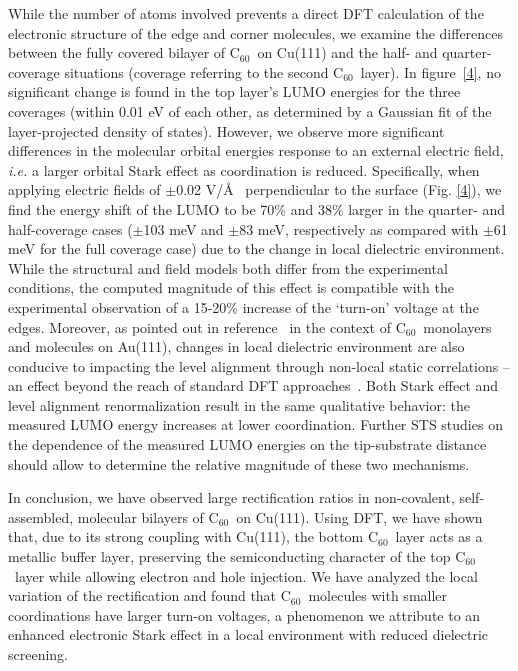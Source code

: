 \documentclass[11pt,showpacs,amsmath,amssymbl]{revtex4}
\newcommand{\buck}{C$_{60}$~}
\begin{document}
While the number of atoms involved prevents a direct DFT calculation of the electronic structure of the edge and corner molecules, we examine the differences between the fully covered bilayer of \buck on Cu(111) and the half- and quarter-coverage situations (coverage referring to the second \buck layer). In figure~\ref{4}, no significant change is found in the top layer's LUMO energies for the three coverages (within 0.01 eV of each other, as determined by a Gaussian fit of the layer-projected density of states). However, we observe more significant differences in the molecular orbital energies response to an external electric field, \textit{i.e.} a larger orbital Stark effect as coordination is reduced. Specifically, when applying electric fields of $\pm$0.02 V/\AA~ perpendicular to the surface (Fig. \ref{4}), we find the energy shift of the LUMO to be {70\% and 38\% larger in the quarter- and half-coverage cases ($\pm$103 meV and $\pm$83 meV, respectively} as compared with $\pm$61 meV for the full coverage case) due to the change in local dielectric environment. While the structural and field models both differ from the experimental {conditions}, the computed magnitude of this effect is compatible with the experimental observation of a 15-20\% increase of the `turn-on' voltage at the edges. {Moreover, as pointed out in reference~\cite{FernandezTorrente} in the context of \buck monolayers and molecules on Au(111), changes in local dielectric environment are also conducive to impacting the level alignment through non-local static correlations -- an effect beyond the reach of standard DFT approaches~\cite{Neaton}. Both Stark effect and level alignment renormalization result in the same qualitative behavior: the measured LUMO energy increases at lower coordination. Further STS studies on the dependence of the measured LUMO energies on the tip-substrate distance should allow to determine the relative magnitude of these two mechanisms.}

In conclusion, we have observed large rectification ratios in non-covalent, self-assembled, molecular bilayers of \buck on Cu(111). Using DFT, we have shown that, due to its strong coupling with Cu(111), the bottom \buck layer acts as a metallic buffer layer, preserving the semiconducting character of the top \buck layer while allowing electron and hole injection. We have analyzed the local variation of the rectification and found that \buck molecules with smaller coordinations have larger turn-on voltages, a phenomenon we attribute to an enhanced electronic Stark effect in a local environment with reduced dielectric screening.
\end{document}
